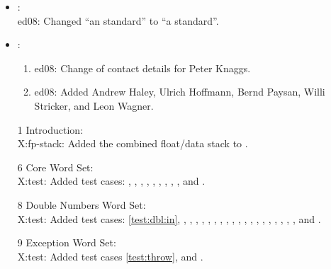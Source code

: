 	\begin{itemize}
	\item {}: \\
		\textsf{ed08}: Changed ``an standard'' to ``a standard''.

	\item {}:
		\begin{enumerate}
		\item \textsf{ed08}: Change of contact details for Peter Knaggs.
		\item \textsf{ed08}: Added Andrew Haley, Ulrich Hoffmann,
			Bernd Paysan, Willi Stricker, and Leon Wagner.
		\end{enumerate}

	\item[1] Introduction: \\
		\textsf{X:fp-stack}: Added the combined float/data
			stack to .

	\item[6] Core Word Set: \\
		\textsf{X:test}: Added test cases:
			,
			,
			,
			,
			,
			,
			,
			,
			,
			 and
			.

	\item[8] Double Numbers Word Set: \\
		\textsf{X:test}: Added test cases:
		\ref{test:dbl:in},
		, 
		, \linebreak
		,
		,
		,
		,
		,
		,
		,
		,
		,
		,
		,
		,
		,
		, \linebreak
		,
		,
		,
		 and
		.

	\item[9] Exception Word Set: \\
		\textsf{X:test}: Added test cases
		\ref{test:throw},
		 and
		.


\end{itemize}
